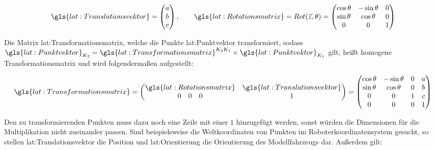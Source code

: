 \begin{equation}
\gls{lat:Translationsvektor} = 
\begin{pmatrix}
a 	\\
b 	\\
c    	\\
\end{pmatrix}
, \qquad
\gls{lat:Rotationsmatrix} = Rot(\vec{z},\theta) = 
\begin{pmatrix}
\cos{\theta} & -\sin{\theta} & {0} 	\\
\sin{\theta} & \cos{\theta} & {0} 	\\
{0} & {0} & {1} 				    	\\
\end{pmatrix}
\end{equation} 		

Die Matrix \gls{lat:Transformationsmatrix}, welche die Punkte \gls{lat:Punktvektor} transformiert, sodass 
\( \gls{lat:Punktvektor}_{K_2} = \gls{lat:Transformationsmatrix}^{K_2K_1} \times  \gls{lat:Punktvektor}_{K_1}	\) gilt, heißt homogene Transformationsmatrix und wird folgendermaßen aufgestellt:

\begin{equation}
\gls{lat:Transformationsmatrix} = 
\begin{pmatrix}
\gls{lat:Rotationsmatrix} &  \gls{lat:Translationsvektor}	\\
0 \quad 0 \quad 0 & 1 	\\
\end{pmatrix}
=
\begin{pmatrix}
\cos{\theta} & -\sin{\theta} & {0} & a 	\\
\sin{\theta} & \cos{\theta} & {0} & b 	\\
{0} & {0} & {1} & c 				    	\\
0 & 0 & 0 & 1 						\\
\end{pmatrix}
\end{equation}

Den zu transformierenden Punkten muss dazu noch eine Zeile mit einer \(1\) hinzugefügt werden, sonst würden die Dimensionen für die Multiplikation nicht zueinander passen. Sind beispielsweise die Weltkoordinaten von Punkten im Roboterkoordinatensystem gesucht, so stellen \gls{lat:Translationsvektor} die Position und \gls{lat:Orientierung} die Orientierung des Modellfahrzeugs dar. Außerdem gilt: 

